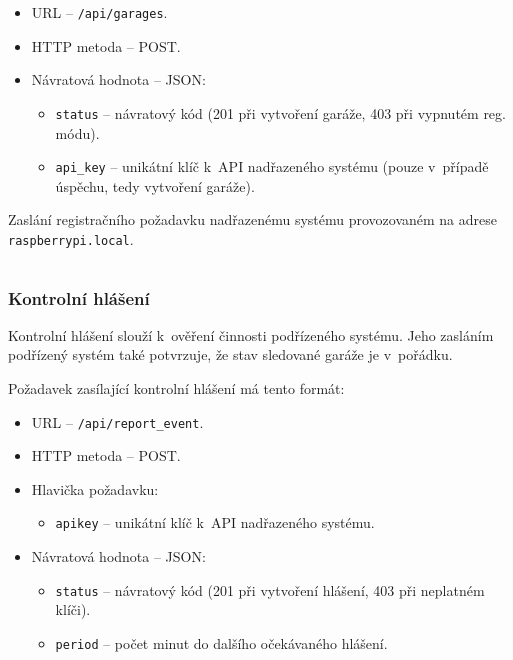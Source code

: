 \begin{itemize}
    \item URL -- \texttt{/api/garages}.
    \item HTTP metoda -- POST.
    \item Návratová hodnota -- JSON:
    \begin{itemize}
        \item \texttt{status} -- návratový kód (201 při vytvoření garáže, 403 při vypnutém reg. módu).
        \item \texttt{api\_key} -- unikátní klíč k~API nadřazeného systému (pouze v~případě úspěchu, tedy vytvoření garáže).
    \end{itemize}
\end{itemize}

\begin{listing}[htbp]
\caption{\label{lst:api_reg} Zaslání registračního požadavku nadřazenému systému provozovaném na adrese \texttt{raspberrypi.local}.}
\inputminted[bgcolor=codebg]{python}{source-samples/api_reg.py}
\end{listing}

\newpage

\subsubsection{Kontrolní hlášení}

Kontrolní hlášení slouží k~ověření činnosti podřízeného systému. Jeho zasláním podřízený systém také potvrzuje, že stav sledované garáže je v~pořádku. 

Požadavek zasílající kontrolní hlášení má tento formát:

\begin{itemize}
    \item URL -- \texttt{/api/report\_event}.
    \item HTTP metoda -- POST.
    \item Hlavička požadavku:
    \begin{itemize}
        \item \texttt{apikey} -- unikátní klíč k~API nadřazeného systému.
    \end{itemize}
    \item Návratová hodnota -- JSON:
    \begin{itemize}
        \item \texttt{status} -- návratový kód (201 při vytvoření hlášení, 403 při neplatném klíči).
        \item \texttt{period} -- počet minut do dalšího očekávaného hlášení.
    \end{itemize}
\end{itemize}

